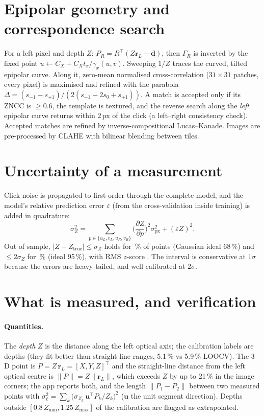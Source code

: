 \documentclass[11pt,a4paper]{article}
\newcommand{\vr}{\mathbf{r}}
\newcommand{\vd}{\mathbf{d}}
\newcommand{\G}{\Gamma}
\begin{document}
\section{Epipolar geometry and correspondence search}
For a left pixel and depth $Z$: $P_R=R^\top(Z\vr_L-\vd)$, then $\G_R$ is inverted by the fixed point
$u\leftarrow C_X+C_Xt_x/\gamma_x(u,v)$. Sweeping $1/Z$ traces the curved, tilted epipolar curve. Along it, zero-mean
normalised cross-correlation ($31\times31$ patches, every pixel) is maximised and refined with the parabola
$\Delta=(s_{-1}-s_{+1})/(2(s_{-1}-2s_0+s_{+1}))$. A match is accepted only if its ZNCC is $\ge0.6$, the template is
textured, and the reverse search along the \emph{left} epipolar curve returns within 2\,px of the click (a
left--right consistency check). Accepted matches are refined by inverse-compositional Lucas--Kanade. Images
are pre-processed by CLAHE with bilinear blending between tiles.

\section{Uncertainty of a measurement}
Click noise is propagated to first order through the complete model, and the model's relative prediction error
$\varepsilon$ (from the cross-validation inside training) is added in quadrature:
\[
\sigma_Z^2=\sum_{p\in\{u_L,v_L,u_R,v_R\}}\Big(\frac{\partial Z}{\partial p}\Big)^2\sigma_\text{px}^2+(\varepsilon Z)^2 .
\]
Out of sample, $|Z-Z_\text{true}|\le\sigma_Z$ holds for \CovOne\,\% of points (Gaussian ideal 68\,\%) and $\le2\sigma_Z$
for \CovTwo\,\% (ideal 95\,\%), with RMS $z$-score \RmsZ. The interval is conservative at $1\sigma$ because the
errors are heavy-tailed, and well calibrated at $2\sigma$.

\section{What is measured, and verification}
\paragraph{Quantities.} The \emph{depth} $Z$ is the distance along the left optical axis; the calibration labels
are depths (they fit better than straight-line ranges, 5.1\,\% vs 5.9\,\% LOOCV). The 3-D point is
$P=Z\,\vr_L=[X,Y,Z]^\top$ and the straight-line distance from the left optical centre is $\|P\|=Z\|\vr_L\|$, which exceeds
$Z$ by up to 21\,\% in the image corners; the app reports both, and the length $\|P_1-P_2\|$ between two measured
points with $\sigma_\ell^2=\sum_k\big(\sigma_{Z_k}\,\mathbf u^\top P_k/Z_k\big)^2$ ($\mathbf u$ the unit segment direction).
Depths outside $[0.8\,Z_{\min},1.25\,Z_{\max}]$ of the calibration are flagged as extrapolated.
\end{document}

